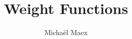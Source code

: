 \documentclass[a4paper]{article}
\title{Weight Functions}
\author{Michaël Maex}
\begin{document}
\maketitle

\tableofcontents



\todototoc
\listoftodos
\pagebreak






\pagebreak
\printbibliography
\end{document}
